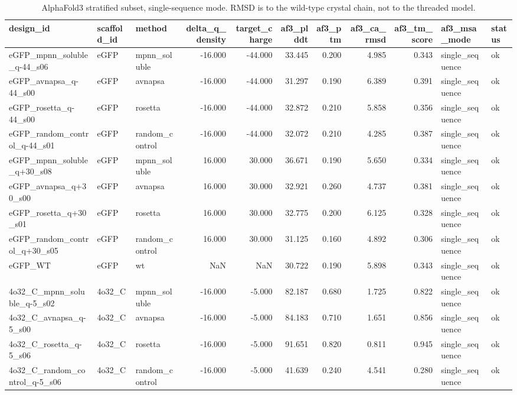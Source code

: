 \begin{table}
\caption{AlphaFold3 stratified subset, single-sequence mode. RMSD is to the wild-type crystal chain, not to the threaded model.}
\label{tab:T4_af3_subset}
\begin{tabular}{lllrrrrrrll}
\toprule
design\_id & scaffold\_id & method & delta\_q\_density & target\_charge & af3\_plddt & af3\_ptm & af3\_ca\_rmsd & af3\_tm\_score & af3\_msa\_mode & status \\
\midrule
eGFP\_mpnn\_soluble\_q-44\_s06 & eGFP & mpnn\_soluble & -16.000 & -44.000 & 33.445 & 0.200 & 4.985 & 0.343 & single\_sequence & ok \\
eGFP\_avnapsa\_q-44\_s00 & eGFP & avnapsa & -16.000 & -44.000 & 31.297 & 0.190 & 6.389 & 0.391 & single\_sequence & ok \\
eGFP\_rosetta\_q-44\_s00 & eGFP & rosetta & -16.000 & -44.000 & 32.872 & 0.210 & 5.858 & 0.356 & single\_sequence & ok \\
eGFP\_random\_control\_q-44\_s01 & eGFP & random\_control & -16.000 & -44.000 & 32.072 & 0.210 & 4.285 & 0.387 & single\_sequence & ok \\
eGFP\_mpnn\_soluble\_q+30\_s08 & eGFP & mpnn\_soluble & 16.000 & 30.000 & 36.671 & 0.190 & 5.650 & 0.334 & single\_sequence & ok \\
eGFP\_avnapsa\_q+30\_s00 & eGFP & avnapsa & 16.000 & 30.000 & 32.921 & 0.260 & 4.737 & 0.381 & single\_sequence & ok \\
eGFP\_rosetta\_q+30\_s01 & eGFP & rosetta & 16.000 & 30.000 & 32.775 & 0.200 & 6.125 & 0.328 & single\_sequence & ok \\
eGFP\_random\_control\_q+30\_s05 & eGFP & random\_control & 16.000 & 30.000 & 31.125 & 0.160 & 4.892 & 0.306 & single\_sequence & ok \\
eGFP\_WT & eGFP & wt & NaN & NaN & 30.722 & 0.190 & 5.898 & 0.343 & single\_sequence & ok \\
4o32\_C\_mpnn\_soluble\_q-5\_s02 & 4o32\_C & mpnn\_soluble & -16.000 & -5.000 & 82.187 & 0.680 & 1.725 & 0.822 & single\_sequence & ok \\
4o32\_C\_avnapsa\_q-5\_s00 & 4o32\_C & avnapsa & -16.000 & -5.000 & 84.183 & 0.710 & 1.651 & 0.856 & single\_sequence & ok \\
4o32\_C\_rosetta\_q-5\_s06 & 4o32\_C & rosetta & -16.000 & -5.000 & 91.651 & 0.820 & 0.811 & 0.945 & single\_sequence & ok \\
4o32\_C\_random\_control\_q-5\_s06 & 4o32\_C & random\_control & -16.000 & -5.000 & 41.639 & 0.240 & 4.541 & 0.280 & single\_sequence & ok \\

\end{tabular}
\end{table}
